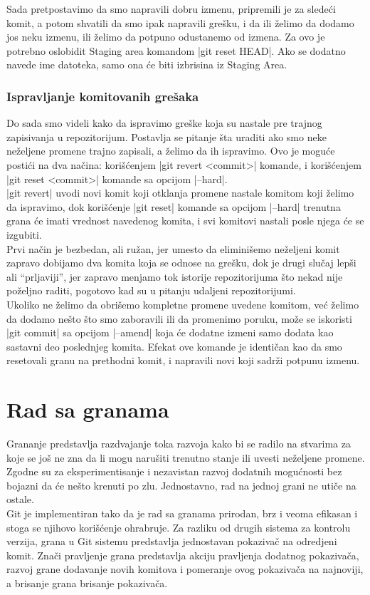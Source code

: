 \documentclass[a4paper]{article}
\begin{document}
{Sada pretpostavimo da smo napravili dobru izmenu, pripremili je za sledeći komit, a potom shvatili da smo ipak napravili grešku, i da ili želimo da dodamo jos neku izmenu, ili želimo da potpuno odustanemo od izmena. Za ovo je potrebno oslobidit Staging area komandom |git reset HEAD|. Ako se dodatno navede ime datoteka, samo ona će biti izbrisina iz Staging Area.

\subsubsection*{Ispravljanje komitovanih grešaka}
\label{komitovane_greske}
Do sada smo videli kako da ispravimo greške koja su nastale pre trajnog zapisivanja u repozitorijum. Postavlja se pitanje šta uraditi ako smo neke neželjene promene trajno zapisali, a želimo da ih ispravimo. Ovo je moguće postići na dva načina: korišćenjem |git revert <commit>| komande, i korišćenjem |git reset <commit>| komande sa opcijom |--hard|.\\
|git revert| uvodi novi komit koji otklanja promene nastale komitom koji želimo da ispravimo, dok korišćenje |git reset| komande sa opcijom |--hard| trenutna grana će imati vrednost navedenog komita, i svi komitovi nastali posle njega će se izgubiti. \\
Prvi način je bezbedan, ali ružan, jer umesto da eliminišemo neželjeni komit zapravo dobijamo dva komita koja se odnose na grešku, dok je drugi slučaj lepši ali ``prljaviji'', jer zapravo menjamo tok istorije repozitorijuma što nekad nije poželjno raditi, pogotovo kad su u pitanju udaljeni repozitorijumi. \\

Ukoliko ne želimo da obrišemo kompletne promene uvedene komitom, već želimo da dodamo nešto što smo zaboravili ili da promenimo poruku, može se iskoristi |git commit| sa opcijom |--amend|  koja će dodatne izmeni samo dodata kao sastavni deo poslednjeg komita. Efekat ove komande je identičan kao da smo resetovali granu na prethodni komit, i napravili novi koji sadrži potpunu izmenu.


\section{Rad sa granama}
\label{sec:grane}
Grananje predstavlja razdvajanje toka razvoja kako bi se radilo na stvarima za koje se još ne zna da li mogu narušiti trenutno stanje ili uvesti neželjene promene. Zgodne su za eksperimentisanje i nezavistan razvoj dodatnih mogućnosti bez bojazni da će nešto krenuti po zlu. Jednostavno, rad na jednoj grani ne utiče na ostale.\\
Git je implementiran tako da je rad sa granama prirodan, brz i veoma efikasan i stoga se njihovo korišćenje ohrabruje. Za razliku od drugih sistema za kontrolu verzija, grana u Git sistemu predstavlja jednostavan pokazivač na odredjeni komit. Znači pravljenje grana predstavlja akciju pravljenja dodatnog pokazivača, razvoj grane dodavanje novih komitova i pomeranje ovog pokazivača na najnoviji, a brisanje grana brisanje pokazivača.

}
\end{document}

